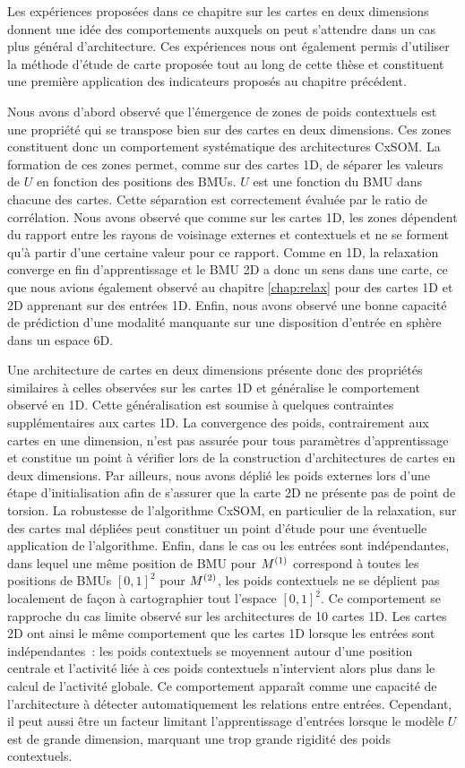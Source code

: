 \documentclass[../main]{subfiles}
\begin{document}
Les expériences proposées dans ce chapitre sur les cartes en deux dimensions donnent une idée des comportements auxquels on peut s'attendre dans un cas plus général d'architecture.
Ces expériences nous ont également permis d'utiliser la méthode d'étude de carte proposée tout au long de cette thèse et constituent une première application des indicateurs proposés au chapitre précédent.


Nous avons d'abord observé que l'émergence de zones de poids contextuels est une propriété qui se transpose bien sur des cartes en deux dimensions. Ces zones constituent donc un comportement systématique des architectures CxSOM.
La formation de ces zones permet, comme sur des cartes 1D, de séparer les valeurs de $U$ en fonction des positions des BMUs. $U$ est une fonction du BMU dans chacune des cartes.
Cette séparation est correctement évaluée par le ratio de corrélation.
Nous avons observé que comme sur les cartes 1D, les zones dépendent du rapport entre les rayons de voisinage externes et contextuels et ne se forment qu'à partir d'une certaine valeur pour ce rapport.
Comme en 1D, la relaxation converge en fin d'apprentissage et le BMU 2D a donc un sens dans une carte, ce que nous avions également observé au chapitre \ref{chap:relax} pour des cartes 1D et 2D apprenant sur des entrées 1D.
Enfin, nous avons observé une bonne capacité de prédiction d'une modalité manquante sur une disposition d'entrée en sphère dans un espace 6D.

Une architecture de cartes en deux dimensions présente donc des propriétés similaires à celles observées sur les cartes 1D et généralise le comportement observé en 1D.
Cette généralisation est soumise à quelques contraintes supplémentaires aux cartes 1D.
La convergence des poids, contrairement aux cartes en une dimension, n'est pas assurée pour tous paramètres d'apprentissage et constitue un point à vérifier lors de la construction d'architectures de cartes en deux dimensions.
Par ailleurs, nous avons déplié les poids externes lors d'une étape d'initialisation afin de s'assurer que la carte 2D ne présente pas de point de torsion. La robustesse de l'algorithme CxSOM, en particulier de la relaxation, sur des cartes \og mal dépliées \fg{} peut constituer un point d'étude pour une éventuelle application de l'algorithme.
Enfin, dans le cas ou les entrées sont indépendantes, dans lequel une même position de BMU pour $M^{({1})}$ correspond à toutes les positions de BMUs $[0,1]^2$ pour $M^{({2})}$, les poids contextuels ne se déplient pas localement de façon à cartographier tout l'espace $[0,1]^2$.
Ce comportement se rapproche du cas limite observé sur les architectures de 10 cartes 1D. 
Les cartes 2D ont ainsi le même comportement que les cartes 1D lorsque les entrées sont indépendantes~: les poids contextuels se moyennent autour d'une position centrale et l'activité liée à ces poids contextuels n'intervient alors plus dans le calcul de l'activité globale.
Ce comportement apparaît comme une capacité de l'architecture à détecter automatiquement les relations entre entrées. Cependant, il peut aussi être un facteur limitant l'apprentissage d'entrées lorsque le modèle $U$ est de grande dimension, marquant une trop grande rigidité des poids contextuels. 
\end{document}
